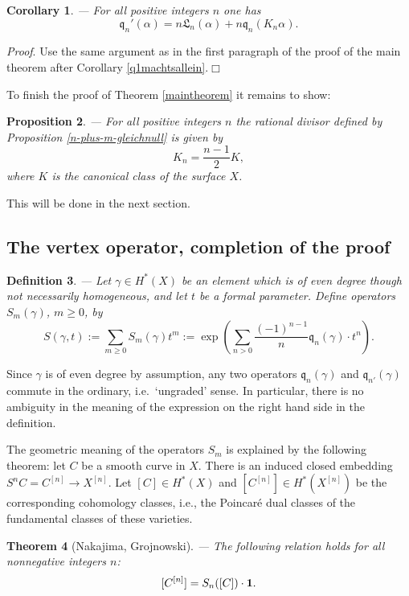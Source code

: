 \documentclass[twoside,11pt]{article}
\newtheorem{theorem}{Theorem}[section]
\newtheorem{proposition}[theorem]{Proposition}
\newtheorem{corollary}[theorem]{Corollary}
\newtheorem{definition}[theorem]{Definition}
\newcommand{\prf}{{\kursiv Proof}. }
\newcommand{\qed}{\hspace*{\fill}$\Box$\vspace{2ex}}
\newcommand{\kursiv}{\sl}
\newcommand{\gothq}{{\mathfrak q}}
\newcommand{\gothL}{{\mathfrak L}}
\newcommand{\qq}{\gothq}
\newcommand{\LL}{\gothL}
\newcommand{\vacuum}{{\bf 1}}
\begin{document}
\begin{corollary}--- For all positive integers $n$ one has
$$\qq_n'(\alpha)=n\LL_n(\alpha)+n\qq_n(K_n\alpha).$$
\end{corollary}

\prf Use the same argument as in the first paragraph of the proof of the main
theorem after Corollary \ref{q1machtsallein}.\qed

To finish the proof of Theorem \ref{maintheorem} it remains to show:

\begin{proposition}\label{identifyKn}--- For all positive integers $n$ the rational divisor
defined by Proposition \ref{n-plus-m-gleichnull} is given by
$$K_n=\frac{n-1}{2}K,$$
where $K$ is the canonical class of the surface $X$.
\end{proposition}
 
This will be done in the next section.

\subsection{The vertex operator, completion of the proof}


\begin{definition}--- Let $\gamma\in H^*(X)$ be an element which is of even
degree though not necessarily homogeneous, and let $t$ be a formal parameter.
Define operators $S_m(\gamma)$, $m\geq0$, by
$$S(\gamma,t):=\sum_{m\geq0}S_m(\gamma)t^m:=
\exp\left(\sum_{n>0}\frac{(-1)^{n-1}}{n}\qq_n(\gamma)\cdot t^n\right).$$
\end{definition}


Since $\gamma$ is of even degree by assumption, any two operators 
$\qq_n(\gamma)$ and $\qq_{n'}(\gamma)$ commute in the ordinary, i.e.\
`ungraded' sense. In particular, there is no ambiguity in the meaning of the
expression on the right hand side in the definition.


The geometric meaning of the operators $S_m$ is explained by the following theorem: let $C$ be a smooth curve in $X$. There is an
induced closed embedding $S^nC=C^{[n]}\to X^{[n]}$. Let $[C]\in H^*(X)$ and
$[C^{[n]}]\in H^*(X^{[n]})$ be the corresponding cohomology classes, i.e., the
Poincar\'e dual classes of the fundamental classes of these varieties.


\begin{theorem}[Nakajima, Grojnowski]\label{Nakonsymmprod}--- The following relation holds for all nonnegative integers $n$:
$$[C^{[n]}]=S_n([C])\cdot \vacuum.$$
\end{theorem}
\end{document}
